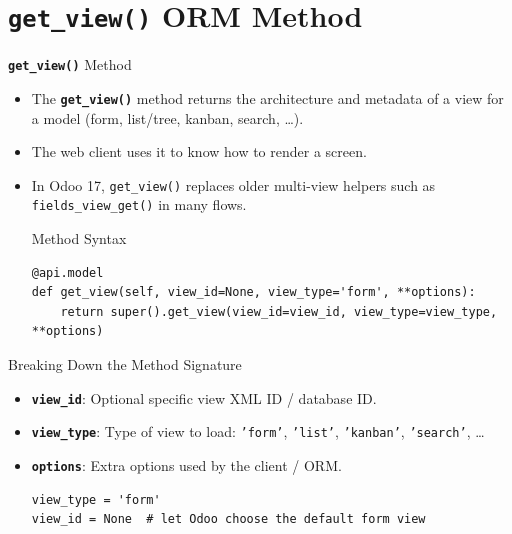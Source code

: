 
\section{\textbf{\texttt{get\_view()}} ORM Method}

\begin{frame}[fragile]{\textbf{\texttt{get\_view()}} Method}
	\begin{itemize}
		\item The \textbf{\texttt{get\_view()}} method returns the architecture and metadata of a view for a model (form, list/tree, kanban, search, \ldots).
		\item The web client uses it to know how to render a screen.
		\item In Odoo 17, \texttt{get\_view()} replaces older multi-view helpers such as \texttt{fields\_view\_get()} in many flows.
\begin{block}{Method Syntax}
\begin{lstlisting}
@api.model
def get_view(self, view_id=None, view_type='form', **options):
	return super().get_view(view_id=view_id, view_type=view_type, **options)
\end{lstlisting}
\end{block}
	\end{itemize}
\end{frame}

\begin{frame}[fragile]{Breaking Down the Method Signature}
	\begin{block}{}
		\begin{itemize}
			\item \textbf{\texttt{view\_id}}: Optional specific view XML ID / database ID.
			\item \textbf{\texttt{view\_type}}: Type of view to load: \texttt{'form'}, \texttt{'list'}, \texttt{'kanban'}, \texttt{'search'}, \ldots
			\item \textbf{\texttt{options}}: Extra options used by the client / ORM.
\begin{lstlisting}
view_type = 'form'
view_id = None  # let Odoo choose the default form view
\end{lstlisting}
		\end{itemize}
	\end{block}
\end{frame}

